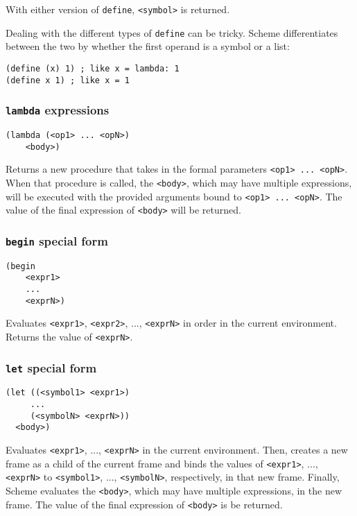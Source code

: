 With either version of \lstinline{define}, \lstinline{<symbol>} is returned. 

Dealing with the different types of \lstinline{define} can be tricky. Scheme differentiates between the two by whether the first operand is a symbol or a list:  
\begin{lstlisting}
(define (x) 1) ; like x = lambda: 1
(define x 1) ; like x = 1
\end{lstlisting}

\subsubsection{\lstinline{lambda} expressions}
\begin{lstlisting}
(lambda (<op1> ... <opN>) 
    <body>) 
\end{lstlisting}
Returns a new procedure that takes in the formal parameters \lstinline{<op1> ... <opN>}. When that procedure is called, the \lstinline{<body>}, which may have multiple expressions, will be executed with the provided arguments bound to \lstinline{<op1> ... <opN>}. The value of the final expression of \lstinline{<body>} will be returned. 

\subsubsection{\lstinline{begin} special form}
\begin{lstlisting}
(begin 
    <expr1>
    ... 
    <exprN>) 
\end{lstlisting}
Evaluates \lstinline{<expr1>}, \lstinline{<expr2>}, ..., \lstinline{<exprN>} in order in the current environment. Returns the value of \lstinline{<exprN>}. 

\subsubsection{\lstinline{let} special form}
\begin{lstlisting}
(let ((<symbol1> <expr1>) 
     ... 
     (<symbolN> <exprN>)) 
  <body>) 
\end{lstlisting}
Evaluates \lstinline{<expr1>}, ..., \lstinline{<exprN>} in the current environment. Then, creates a new frame as a child of the current frame and binds the values of \lstinline{<expr1>}, ..., \lstinline{<exprN>} to \lstinline{<symbol1>}, ..., \lstinline{<symbolN>}, respectively, in that new frame. Finally, Scheme evaluates the \lstinline{<body>}, which may have multiple expressions, in the new frame. The value of the final expression of \lstinline{<body>} is be returned. 

